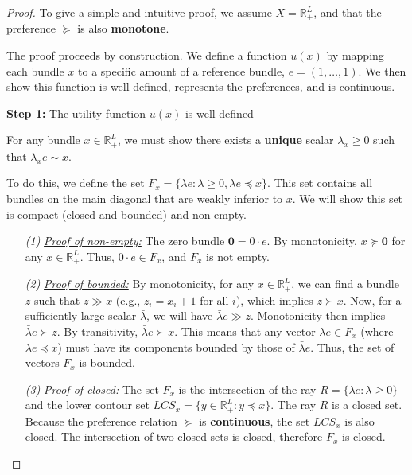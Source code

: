 \begin{proof}
    To give a simple and intuitive proof, we assume $X = \mathbb{R}^{L}_{+}$, and that the preference $\succeq$ is also \textbf{monotone}.

    The proof proceeds by construction. We define a function $u(x)$ by mapping each bundle $x$ to a specific amount of a reference bundle, $e=(1,\dots,1)$. We then show this function is well-defined, represents the preferences, and is continuous.

    \textbf{Step 1:} The utility function $u(x)$ is well-defined

    For any bundle $x \in \mathbb{R}^L_+$, we must show there exists a \textbf{unique} scalar $\lambda_x \ge 0$ such that $\lambda_x e \sim x$.

    To do this, we define the set $F_x = \{\lambda e : \lambda \geq 0, \lambda e \preceq x \}$. This set contains all bundles on the main diagonal that are weakly inferior to $x$. We will show this set is compact (closed and bounded) and non-empty.

    \begin{itemize}
        \item[\textit{(1)}] \textit{\underline{Proof of non-empty:}} The zero bundle $\mathbf{0} = 0 \cdot e$. By monotonicity, $x \succeq \mathbf{0}$ for any $x \in \mathbb{R}^L_+$. Thus, $0 \cdot e \in F_x$, and $F_x$ is not empty.

        \item[\textit{(2)}] \textit{\underline{Proof of bounded:}} By monotonicity, for any $x \in \mathbb{R}^L_+$, we can find a bundle $z$ such that $z \gg x$ (e.g., $z_i = x_i + 1$ for all $i$), which implies $z \succ x$. Now, for a sufficiently large scalar $\bar{\lambda}$, we will have $\bar{\lambda} e \gg z$. Monotonicity then implies $\bar{\lambda} e \succ z$. By transitivity, $\bar{\lambda} e \succ x$. This means that any vector $\lambda e \in F_x$ (where $\lambda e \preceq x$) must have its components bounded by those of $\bar{\lambda}e$. Thus, the set of vectors $F_x$ is bounded.

        \item[\textit{(3)}] \textit{\underline{Proof of closed:}} The set $F_x$ is the intersection of the ray $R = \{\lambda e : \lambda \ge 0\}$ and the lower contour set $LCS_x = \{y \in \mathbb{R}^L_+ : y \preceq x\}$. The ray $R$ is a closed set. Because the preference relation $\succeq$ is \textbf{continuous}, the set $LCS_x$ is also closed. The intersection of two closed sets is closed, therefore $F_x$ is closed.
    \end{itemize}


\end{proof}
